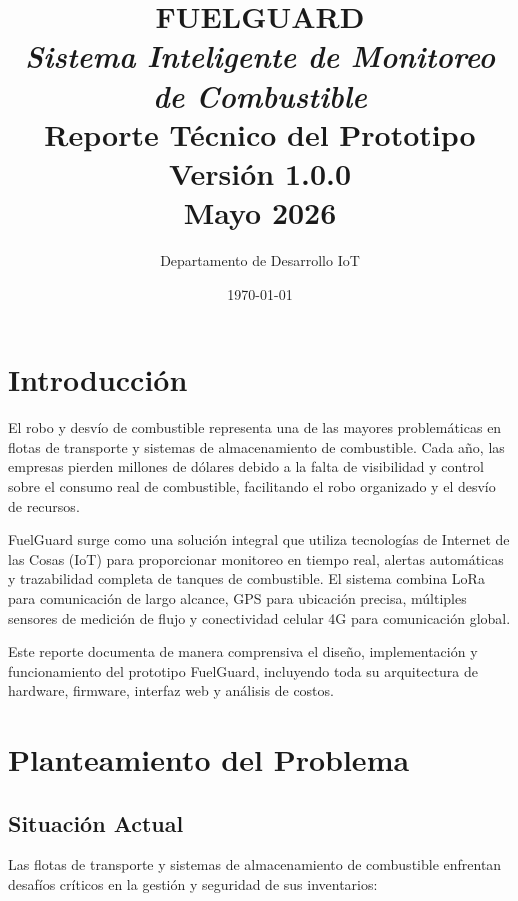 \documentclass[12pt,a4paper,oneside]{report}
\title{%
    \textbf{FUELGUARD}\\
    \vspace{0.5cm}
    \Large \textit{Sistema Inteligente de Monitoreo de Combustible}\\
    \vspace{0.3cm}
    \large Reporte Técnico del Prototipo\\
    \vspace{0.3cm}
    \normalsize Versión 1.0.0\\
    Mayo 2026
}
\author{Departamento de Desarrollo IoT}
\date{\today}
\begin{document}
\maketitle

\newpage

\tableofcontents

\newpage

\chapter{Introducción}

El robo y desvío de combustible representa una de las mayores problemáticas en flotas de transporte y sistemas de almacenamiento de combustible. Cada año, las empresas pierden millones de dólares debido a la falta de visibilidad y control sobre el consumo real de combustible, facilitando el robo organizado y el desvío de recursos.

FuelGuard surge como una solución integral que utiliza tecnologías de Internet de las Cosas (IoT) para proporcionar monitoreo en tiempo real, alertas automáticas y trazabilidad completa de tanques de combustible. El sistema combina LoRa para comunicación de largo alcance, GPS para ubicación precisa, múltiples sensores de medición de flujo y conectividad celular 4G para comunicación global.

Este reporte documenta de manera comprensiva el diseño, implementación y funcionamiento del prototipo FuelGuard, incluyendo toda su arquitectura de hardware, firmware, interfaz web y análisis de costos.

\chapter{Planteamiento del Problema}

\section{Situación Actual}

Las flotas de transporte y sistemas de almacenamiento de combustible enfrentan desafíos críticos en la gestión y seguridad de sus inventarios:
\end{document}
